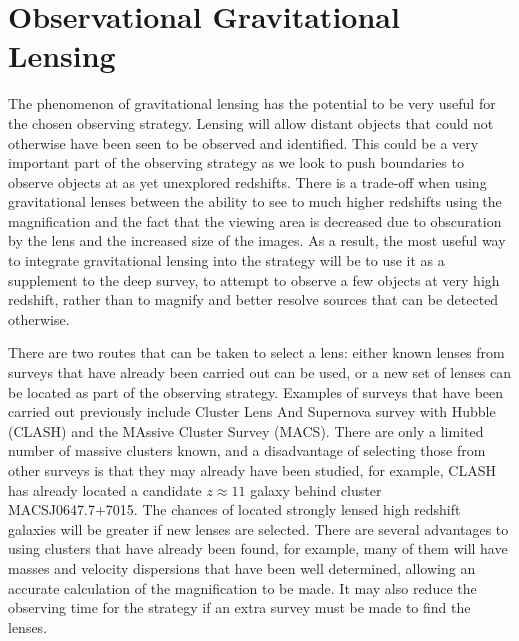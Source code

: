 
\section{Observational Gravitational Lensing} %
\label{sec:observational_gravitational_lensing}
	The phenomenon of gravitational lensing has the potential to be very useful for the chosen observing strategy. Lensing will allow distant objects that could not otherwise have been seen to be observed and identified.  This could be a very important part of the observing strategy as we look to push boundaries to observe objects at as yet unexplored redshifts. There is a trade-off when using gravitational lenses between the ability to see to much higher redshifts using the magnification and the fact that the viewing area is decreased due to obscuration by the lens and the increased size of the images. As a result, the most useful way to integrate gravitational lensing into the strategy will be to use it as a supplement to the deep survey, to attempt to observe a few objects at very high redshift, rather than to magnify and better resolve sources that can be detected otherwise.

	There are two routes that can be taken to select a lens: either known lenses from surveys that have already been carried out can be used, or a new set of lenses can be located as part of the observing strategy. Examples of surveys that have been carried out previously include Cluster Lens And Supernova survey with Hubble (CLASH)\cite{CLASH} and the MAssive Cluster Survey (MACS)\cite{MACS}. There are only a limited number of massive clusters known, and a disadvantage of selecting those from other surveys is that they may already have been studied, for example, CLASH has already located a candidate $z\approx11$ galaxy behind cluster MACSJ0647.7+7015\cite{CLASH_z11_candidate}. The chances of located strongly lensed high redshift galaxies will be greater if new lenses are selected. There are several advantages to using clusters that have already been found, for example, many of them will have masses and velocity dispersions that have been well determined, allowing an accurate calculation of the magnification to be made. It may also reduce the observing time for the strategy if an extra survey must be made to find the lenses.

